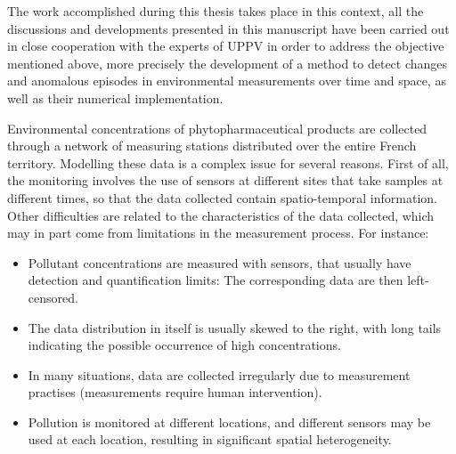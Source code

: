 The work accomplished during this thesis takes place in this context, all the discussions and developments presented in this manuscript have been carried out in close cooperation with the experts of UPPV in order to address the objective mentioned above, more precisely the development of a method to detect changes and anomalous episodes in environmental measurements over time and space, as well as their numerical implementation.

Environmental concentrations of phytopharmaceutical products are collected through a network of measuring stations distributed over the entire French territory.  Modelling these data is a complex issue for several reasons. First of all, the monitoring involves the use of sensors at different sites that take samples at different times, so that the data collected contain spatio-temporal information. Other difficulties are related to the characteristics of the data collected, which may in part come from limitations in the measurement process. For instance: 
\begin{itemize}
\item Pollutant concentrations are measured with sensors, that usually have detection and quantification limits: The corresponding data are then left-censored.
\item The data distribution in itself is usually skewed to the right, with long tails indicating the  possible occurrence of high concentrations.
\item In many situations, data are collected irregularly due to measurement practises (measurements require human intervention).
\item Pollution is monitored at different locations, and different sensors may be used at each location, resulting in significant spatial heterogeneity.
\end{itemize}





